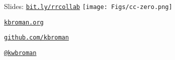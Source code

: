 \documentclass[aspectratio=169,12pt,t]{beamer}
\begin{document}
\begin{frame}[c]{}

\Large

Slides: \href{https://bit.ly/rrcollab}{\tt bit.ly/rrcollab} \quad
\texttt{[image: Figs/cc-zero.png]}

\vspace{10mm}

\href{https://kbroman.org}{\tt kbroman.org}

\vspace{10mm}

\href{https://github.com/kbroman}{\tt github.com/kbroman}

\vspace{10mm}

\href{https://twitter.com/kwbroman}{\tt @kwbroman}


\end{frame}
\end{document}
